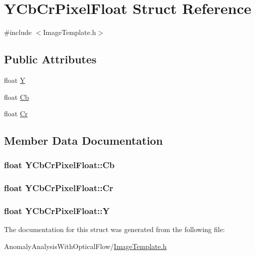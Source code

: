 \hypertarget{struct_y_cb_cr_pixel_float}{\section{Y\+Cb\+Cr\+Pixel\+Float Struct Reference}
\label{struct_y_cb_cr_pixel_float}
}


{\ttfamily \#include $<$Image\+Template.\+h$>$}

\subsection*{Public Attributes}
\begin{DoxyCompactItemize}
\item 
float \hyperlink{struct_y_cb_cr_pixel_float_a1b242f4aef9f832ac2d91cfd6382eaf0}{Y}
\item 
float \hyperlink{struct_y_cb_cr_pixel_float_ab90afa5071c7893b049d8024ccb6f5b7}{Cb}
\item 
float \hyperlink{struct_y_cb_cr_pixel_float_aeb54e0e62f3c1ecc94b445215f380016}{Cr}
\end{DoxyCompactItemize}


\subsection{Member Data Documentation}
\hypertarget{struct_y_cb_cr_pixel_float_ab90afa5071c7893b049d8024ccb6f5b7}{
\subsubsection[{Cb}]{\setlength{\rightskip}{0pt plus 5cm}float Y\+Cb\+Cr\+Pixel\+Float\+::\+Cb}}\label{struct_y_cb_cr_pixel_float_ab90afa5071c7893b049d8024ccb6f5b7}
\hypertarget{struct_y_cb_cr_pixel_float_aeb54e0e62f3c1ecc94b445215f380016}{
\subsubsection[{Cr}]{\setlength{\rightskip}{0pt plus 5cm}float Y\+Cb\+Cr\+Pixel\+Float\+::\+Cr}}\label{struct_y_cb_cr_pixel_float_aeb54e0e62f3c1ecc94b445215f380016}
\hypertarget{struct_y_cb_cr_pixel_float_a1b242f4aef9f832ac2d91cfd6382eaf0}{
\subsubsection[{Y}]{\setlength{\rightskip}{0pt plus 5cm}float Y\+Cb\+Cr\+Pixel\+Float\+::\+Y}}\label{struct_y_cb_cr_pixel_float_a1b242f4aef9f832ac2d91cfd6382eaf0}


The documentation for this struct was generated from the following file\+:\begin{DoxyCompactItemize}
\item 
Anomaly\+Analysis\+With\+Optical\+Flow/\hyperlink{_image_template_8h}{Image\+Template.\+h}\end{DoxyCompactItemize}
